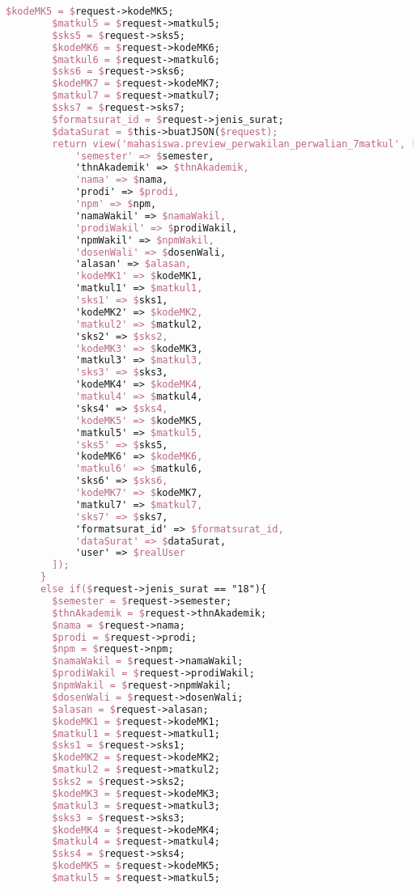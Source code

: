 \begin{lstlisting}[language=tex,basicstyle=\tiny,caption=PesanansuratController.php]
        $kodeMK5 = $request->kodeMK5;
        $matkul5 = $request->matkul5;
        $sks5 = $request->sks5;
        $kodeMK6 = $request->kodeMK6;
        $matkul6 = $request->matkul6;
        $sks6 = $request->sks6;
        $kodeMK7 = $request->kodeMK7;
        $matkul7 = $request->matkul7;
        $sks7 = $request->sks7;
        $formatsurat_id = $request->jenis_surat;
        $dataSurat = $this->buatJSON($request);
        return view('mahasiswa.preview_perwakilan_perwalian_7matkul', [
            'semester' => $semester,
            'thnAkademik' => $thnAkademik,
            'nama' => $nama,
            'prodi' => $prodi,
            'npm' => $npm,
            'namaWakil' => $namaWakil,
            'prodiWakil' => $prodiWakil,
            'npmWakil' => $npmWakil,
            'dosenWali' => $dosenWali,
            'alasan' => $alasan,
            'kodeMK1' => $kodeMK1,
            'matkul1' => $matkul1,
            'sks1' => $sks1,
            'kodeMK2' => $kodeMK2,
            'matkul2' => $matkul2,
            'sks2' => $sks2,
            'kodeMK3' => $kodeMK3,
            'matkul3' => $matkul3,
            'sks3' => $sks3,
            'kodeMK4' => $kodeMK4,
            'matkul4' => $matkul4,
            'sks4' => $sks4,
            'kodeMK5' => $kodeMK5,
            'matkul5' => $matkul5,
            'sks5' => $sks5,
            'kodeMK6' => $kodeMK6,
            'matkul6' => $matkul6,
            'sks6' => $sks6,
            'kodeMK7' => $kodeMK7,
            'matkul7' => $matkul7,
            'sks7' => $sks7,
            'formatsurat_id' => $formatsurat_id,
            'dataSurat' => $dataSurat,
            'user' => $realUser
        ]);
      }
      else if($request->jenis_surat == "18"){
        $semester = $request->semester;
        $thnAkademik = $request->thnAkademik;
        $nama = $request->nama;
        $prodi = $request->prodi;
        $npm = $request->npm;
        $namaWakil = $request->namaWakil;
        $prodiWakil = $request->prodiWakil;
        $npmWakil = $request->npmWakil;
        $dosenWali = $request->dosenWali;
        $alasan = $request->alasan;
        $kodeMK1 = $request->kodeMK1;
        $matkul1 = $request->matkul1;
        $sks1 = $request->sks1;
        $kodeMK2 = $request->kodeMK2;
        $matkul2 = $request->matkul2;
        $sks2 = $request->sks2;
        $kodeMK3 = $request->kodeMK3;
        $matkul3 = $request->matkul3;
        $sks3 = $request->sks3;
        $kodeMK4 = $request->kodeMK4;
        $matkul4 = $request->matkul4;
        $sks4 = $request->sks4;
        $kodeMK5 = $request->kodeMK5;
        $matkul5 = $request->matkul5;

\end{lstlisting}
